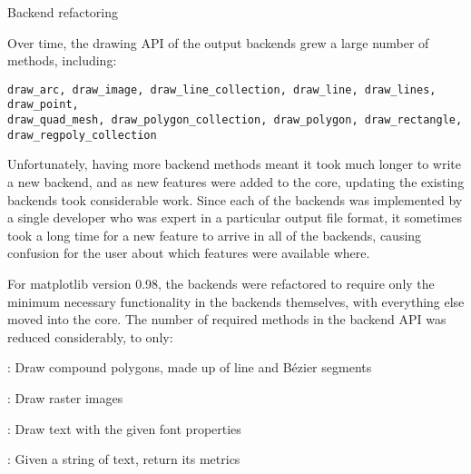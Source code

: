 \begin{aosasect1}{Backend refactoring}


Over time, the drawing API of the output backends grew a large number
of methods, including:

\begin{verbatim}
draw_arc, draw_image, draw_line_collection, draw_line, draw_lines, draw_point,
draw_quad_mesh, draw_polygon_collection, draw_polygon, draw_rectangle,
draw_regpoly_collection
\end{verbatim}

Unfortunately, having more backend methods meant it took much longer
to write a new backend, and as new features were added to the core,
updating the existing backends took considerable work.  Since each of
the backends was implemented by a single developer who was expert in a
particular output file format, it sometimes took a long time for a new
feature to arrive in all of the backends, causing confusion for the
user about which features were available where.

For matplotlib version 0.98, the backends were refactored to require
only the minimum necessary functionality in the backends themselves,
with everything else moved into the core.  The number of required
methods in the backend API was reduced considerably, to only:

\begin{aosaitemize}

  \item {}: Draw compound polygons, made up of line and
    B\'ezier segments

  \item {}: Draw raster images

  \item {}: Draw text with the given font properties

  \item {}: Given a string of
    text, return its metrics

\end{aosaitemize}


\end{aosasect1}
